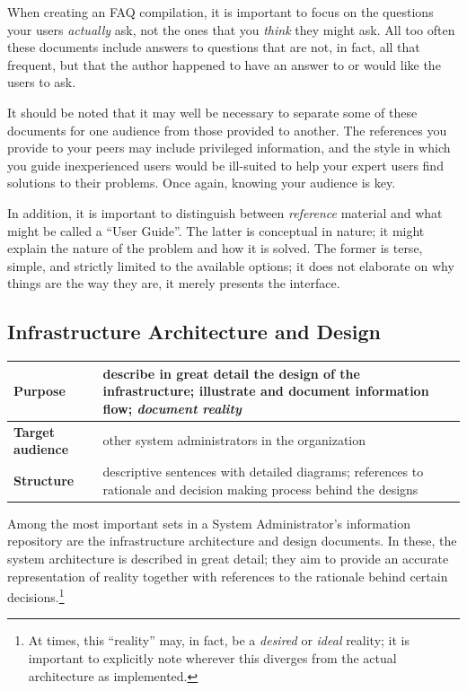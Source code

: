 When creating an FAQ compilation, it is important to
focus on the questions your users {\em actually} ask,
not the ones that you {\em think} they might ask.  All
too often these documents include answers to questions
that are not, in fact, all that frequent, but that the
author happened to have an answer to or would like the
users to ask.

It should be noted that it may well be necessary to
separate some of these documents for one audience from
those provided to another.  The references you provide
to your peers may include privileged information, and
the style in which you guide inexperienced users would
be ill-suited to help your expert users find solutions
to their problems.  Once again, knowing your audience
is key.

In addition, it is important to distinguish between
{\em reference} material and what might be called a
``User Guide''.  The latter is conceptual in nature;
it might explain the nature of the problem and how it
is solved.  The former is terse, simple, and strictly
limited to the available options; it does not
elaborate on why things are the way they are, it
merely presents the interface.


\subsection{Infrastructure Architecture and Design}
\label{documentation:types:infra-design}

\vspace{.25in}
\begin{tabular}[ht]{ l p{}}
	\hline
	{\bf Purpose} & describe in great detail the design of the infrastructure; \newline
			illustrate and document information flow; \newline
			{\em document reality} \\
	\hline
	{\bf Target audience} & other system administrators in the organization \\
	\hline
	{\bf Structure} &  descriptive sentences with detailed diagrams; \newline
				references to rationale and decision
				making process behind the designs \\
	\hline
\end{tabular}
\vspace{.25in}

Among the most important sets in a System
Administrator's information repository are the
infrastructure architecture and design documents.  In
these, the system architecture is described in great
detail; they aim to provide an accurate representation
of reality together with references to the rationale
behind certain decisions.\footnote{At times, this
``reality'' may, in fact, be a {\em desired} or {\em
ideal} reality; it is important to explicitly note
wherever this diverges from the actual architecture as
implemented.}

